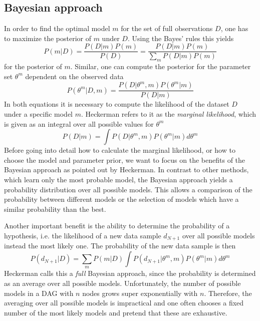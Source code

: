 \documentclass{article}
\begin{document}
	\subsection{Bayesian approach}
	In order to find the optimal model $m$ for the set of full observations $D$, one has to maximize the posterior of $m$
	under $D$. Using the Bayes' rules this yields 
	\begin{equation}
		P(m|D) = \frac{P(D|m)P(m)}{P(D)}=\frac{P(D|m)P(m)}{\sum_m P(D|m)P(m)}
	\end{equation}
	for the posterior of $m$. Similar, one can compute the posterior for the parameter set $\theta^m$ dependent
	on the observed data
	\begin{equation}
		P(\theta^m|D,m)= \frac{P(D|\theta^m,m)P(\theta^m|m)}{P(D|m)}
	\end{equation}
	In both equations it is necessary to compute the likelihood of the dataset $D$ under a specific model $m$.
	Heckerman refers to it as the \textit{marginal likelihood}, which is given as an integral over all
	possible values for $\theta^m$
	\begin{equation}
		P(D|m) = \int P(D|\theta^m,m)P(\theta^m|m) d\theta^m
		\label{eqn:marginal}
	\end{equation}
	Before going into detail how to calculate the marginal likelihood, or how to choose the model and parameter
	prior, we want to focus on the benefits of the Bayesian approach as pointed out by Heckerman. In
	contrast to other methods, which learn only the most probable model, the
	Bayesian approach yields a probability distribution over all possible models. This allows a 
	comparison of the probability between different models or the selection of models which have a similar
	probability than the best.
	
	Another important benefit is the ability to determine the probability of a hypothesis,
	i.e. the likelihood of a	new data sample $d_{N+1}$ over all possible models
	instead the most likely one. The probability of the new data sample is then
	\[
		P(d_{N+1}|D)=\sum_m P(m|D)\int P(d_{N+1}|\theta^m,m)P(\theta^m|m)d\theta^m
	\]
	Heckerman calls this a \textit{full} Bayesian approach, since the probability is determined as an average
	over all possible models. Unfortunately, the number of possible models in a DAG with $n$ nodes grows
	super exponentially with $n$. Therefore, the averaging over all possible models is impractical and
	one often chooses a fixed number of the most likely models and pretend that these are exhaustive.
	
\end{document}
